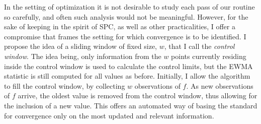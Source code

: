 \documentclass[12pt]{article}
\begin{document}
	In the setting of optimization it is not desirable to study each pass of our routine so carefully, and often such analysis would not be meaningful.
	However, for the sake of keeping in the spirit of SPC, as well as other practicalities, I offer a compromise that frames the setting for which convergence is to be identified.
	I propose the idea of a sliding window of fixed size, $w$, that I call the {\it control window}.
	The idea being, only information from the $w$ points currently residing inside the control window is used to calculate the control limits, but the EWMA statistic is still computed for all values as before.
	Initially, I allow the algorithm to fill the control window, by collecting $w$ observations of $f$.
	As new observations of $f$ arrive, the oldest value is removed from the control window, thus allowing for the inclusion of a new value.
	This offers an automated way of basing the standard for convergence only on the most updated and relevant information.
	
	
\end{document}
